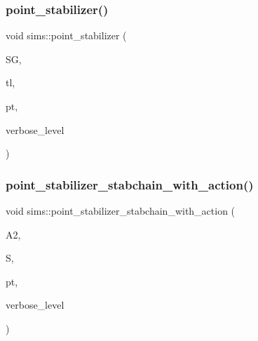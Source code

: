 \mbox{\label{classsims_ae1e1893dffa372d76135b05dcb0aa700}} 
\subsubsection{\texorpdfstring{point\+\_\+stabilizer()}{point\_stabilizer()}}
{\footnotesize\ttfamily void sims\+::point\+\_\+stabilizer (\begin{DoxyParamCaption}\item[{\mbox{\hyperlink{classvector__ge}{vector\+\_\+ge}} \&}]{SG,  }\item[{\mbox{\hyperlink{galois_8h_a09fddde158a3a20bd2dcadb609de11dc}{I\+NT}} $\ast$}]{tl,  }\item[{\mbox{\hyperlink{galois_8h_a09fddde158a3a20bd2dcadb609de11dc}{I\+NT}}}]{pt,  }\item[{\mbox{\hyperlink{galois_8h_a09fddde158a3a20bd2dcadb609de11dc}{I\+NT}}}]{verbose\+\_\+level }\end{DoxyParamCaption})}

\mbox{\label{classsims_a3ab0527c4d7d0647f8f442f3cfb4c1be}} 
\subsubsection{\texorpdfstring{point\+\_\+stabilizer\+\_\+stabchain\+\_\+with\+\_\+action()}{point\_stabilizer\_stabchain\_with\_action()}}
{\footnotesize\ttfamily void sims\+::point\+\_\+stabilizer\+\_\+stabchain\+\_\+with\+\_\+action (\begin{DoxyParamCaption}\item[{\mbox{\hyperlink{classaction}{action}} $\ast$}]{A2,  }\item[{\mbox{\hyperlink{classsims}{sims}} \&}]{S,  }\item[{\mbox{\hyperlink{galois_8h_a09fddde158a3a20bd2dcadb609de11dc}{I\+NT}}}]{pt,  }\item[{\mbox{\hyperlink{galois_8h_a09fddde158a3a20bd2dcadb609de11dc}{I\+NT}}}]{verbose\+\_\+level }\end{DoxyParamCaption})}

